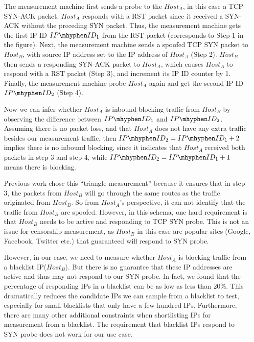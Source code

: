 The measurement machine first sends a probe to the $Host_A$, in this case a TCP
SYN-ACK packet. $Host_A$ responds with a RST packet since it received a SYN-ACK
without the preceding SYN packet. Thus, the measurement machine gets the
first IP ID $IP\mhyphen ID_1$ from the RST packet (corresponds to Step 1 in
the figure). Next, the measurement machine sends a spoofed TCP SYN packet to
$Host_B$, with source IP address set to the IP address of $Host_A$ (Step 2).
$Host_B$ then sends a responding SYN-ACK packet to $Host_A$, which causes $Host_A$
to respond with a RST packet (Step 3), and increment its IP ID counter by 1.
Finally, the measurement machine probe $Host_A$ again and get the second IP ID
$IP\mhyphen ID_2$ (Step 4).

Now we can infer whether $Host_A$ is inbound blocking traffic from $Host_B$ by
observing the difference between $IP\mhyphen ID_1$ and $IP\mhyphen ID_2$.
Assuming there is no packet loss, and that $Host_A$ does not have any extra
traffic besides our measurement traffic, then
$IP\mhyphen ID_2 = IP\mhyphen ID_1 + 2$ implies there is no inbound blocking,
since it indicates that $Host_A$ received both packets in step 3 and step 4,
while $IP\mhyphen ID_2 = IP\mhyphen ID_1 + 1$ means there is blocking.

Previous work chose this ``triangle measurement'' because it ensures that in
step 3, the packets from $Host_B$ will go through the same routes as the
traffic originated from $Host_B$. So from $Host_A$'s perspective, it can not
identify that the traffic from $Host_B$ are spoofed. However, in this schema,
one hard requirement is that $Host_B$ needs to be active and responding to TCP
SYN probe. This is not an issue for censorship measurement, as $Host_B$ in this
case are popular sites (Google, Facebook, Twitter etc.) that guaranteed will
respond to SYN probe.

However, in our case, we need to measure whether $Host_A$ is blocking traffic
from a blacklist IP($Host_B$). But there is no guarantee that these IP
addresses are active and thus may not respond to our SYN probe. In fact, we
found that the percentage of responding IPs in a blacklist can be as low as less
than 20\%. This dramatically reduces the candidate IPs we can sample from a
blacklist to test, especially for small blacklists that only have a few hundred
IPs. Furthermore, there are many other additional constraints when shortlisting
IPs for measurement from a blacklist.
The requirement that blacklist IPs respond to SYN probe does not work for our
use case. 

